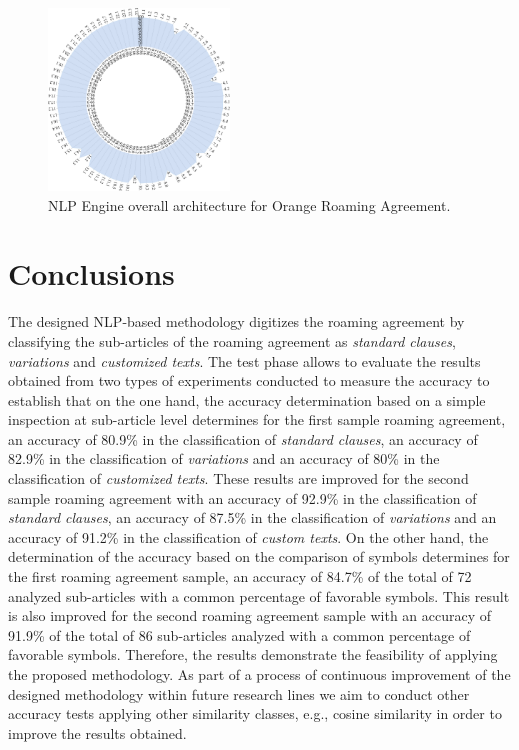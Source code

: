 \documentclass[conference]{style/IEEEtran}
\begin{document}
\begin{figure}[htbp]
\centerline{\includegraphics[width=0.43\textwidth]{images/Orange.png}}
\caption{NLP Engine overall architecture for Orange Roaming Agreement.}
\label{fig4}
\end{figure}

\section{Conclusions}
The designed NLP-based methodology digitizes the roaming agreement by classifying the sub-articles of the roaming agreement as \textit{standard clauses}, \textit{variations} and \textit{customized texts}. The test phase allows to evaluate the results obtained from two types of experiments conducted to measure the accuracy to establish that on the one hand, the accuracy  determination  based  on  a  simple  inspection  at sub-article level determines for the first sample roaming agreement, an accuracy of 80.9\% in the classification of \textit{standard clauses}, an accuracy of 82.9\% in the classification of \textit{variations} and an accuracy of 80\% in the classification of \textit{customized texts}. These results are improved for the second sample roaming agreement with an accuracy of 92.9\% in the classification of \textit{standard clauses}, an accuracy of 87.5\% in the classification of \textit{variations} and an accuracy of 91.2\% in the classification of \textit{custom texts}. On the other hand, the determination of the accuracy based on the comparison of symbols determines for the first roaming agreement sample, an accuracy of 84.7\% of the total of 72 analyzed sub-articles with a common percentage of favorable symbols. This result is also improved for the second roaming agreement sample with an accuracy of 91.9\% of the total of 86 sub-articles analyzed with a common percentage of favorable symbols. Therefore, the results demonstrate the feasibility of applying the proposed methodology. As part of a process of continuous improvement of the designed methodology within future research lines we aim to conduct other accuracy tests applying other similarity classes, e.g., cosine similarity in order to improve the results obtained.
\end{document}
